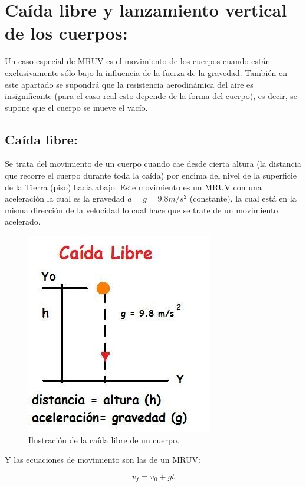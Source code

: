\section{Caída libre y lanzamiento vertical de los cuerpos:}

Un caso especial de MRUV es el movimiento de los cuerpos cuando están exclusivamente sólo bajo la influencia de la fuerza de la 
gravedad. También en este apartado se supondrá que la resistencia aerodinámica del aire es insignificante (para el caso real esto 
depende de la forma del cuerpo), es decir, se supone que el cuerpo se mueve el vacío. 

\subsection{Caída libre:}

Se trata del movimiento de un cuerpo cuando cae desde cierta altura (la distancia que recorre el cuerpo durante toda la caída) 
por encima del nivel de la superficie de la Tierra (piso) hacia abajo. Este movimiento es un MRUV con una aceleración la cual es 
la gravedad $a = g = 9.8 m/s^2$ (constante), la cual está en la misma dirección de la velocidad lo cual hace que se trate de un 
movimiento acelerado. 

\begin{figure}[ht]
 \centering
 \includegraphics[scale=0.5]{images/caida-libre.jpg}
 \caption{Ilustración de la caída libre de un cuerpo.}\label{caidalibre}
\end{figure} 

Y las ecuaciones de movimiento son las de un MRUV:

\begin{equation}
 v_f = v_0 + gt
\end{equation}

